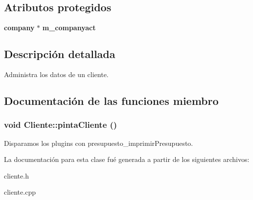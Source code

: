 \subsection*{Atributos protegidos}
\begin{CompactItemize}
\item 
{\bf company} $\ast$ {\bf m\_\-companyact}\label{classCliente_p0}

\end{CompactItemize}


\subsection{Descripci\'{o}n detallada}
Administra los datos de un cliente. 



\subsection{Documentaci\'{o}n de las funciones miembro}
\subsubsection{\setlength{\rightskip}{0pt plus 5cm}void Cliente::pinta\-Cliente ()\hspace{0.3cm}{\tt  [virtual]}}\label{classCliente_a7}


Disparamos los plugins con presupuesto\_\-imprimir\-Presupuesto. 

La documentaci\'{o}n para esta clase fu\'{e} generada a partir de los siguientes archivos:\begin{CompactItemize}
\item 
cliente.h\item 
cliente.cpp\end{CompactItemize}
